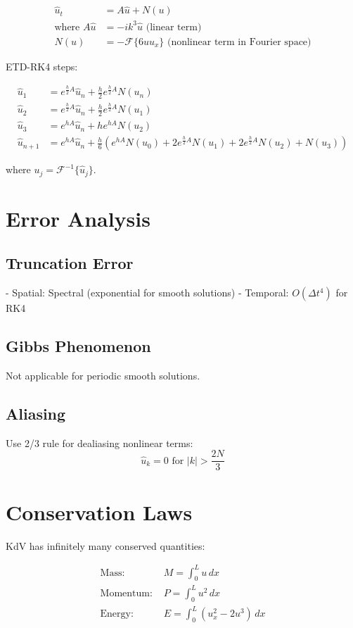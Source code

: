 \documentclass{article}
\begin{document}
\begin{align}
\hat{u}_t &= A\hat{u} + N(u) \\
\text{where } A\hat{u} &= -i k^3 \hat{u} \text{ (linear term)} \\
N(u) &= -\mathcal{F}\{6uu_x\} \text{ (nonlinear term in Fourier space)}
\end{align}

ETD-RK4 steps:

\begin{align}
\hat{u}_1 &= e^{\frac{h}{2}A}\hat{u}_n + \frac{h}{2}e^{\frac{h}{2}A}N(u_n) \\
\hat{u}_2 &= e^{\frac{h}{2}A}\hat{u}_n + \frac{h}{2}e^{\frac{h}{2}A}N(u_1) \\
\hat{u}_3 &= e^{hA}\hat{u}_n + he^{hA}N(u_2) \\
\hat{u}_{n+1} &= e^{hA}\hat{u}_n + \frac{h}{6}\left(e^{hA}N(u_0) + 2e^{\frac{h}{2}A}N(u_1) + 2e^{\frac{h}{2}A}N(u_2) + N(u_3)\right)
\end{align}

where $u_j = \mathcal{F}^{-1}\{\hat{u}_j\}$.

\section{Error Analysis}

\subsection{Truncation Error}
- Spatial: Spectral (exponential for smooth solutions)
- Temporal: $O(\Delta t^4)$ for RK4

\subsection{Gibbs Phenomenon}
Not applicable for periodic smooth solutions.

\subsection{Aliasing}
Use 2/3 rule for dealiasing nonlinear terms:
\begin{equation}
\hat{u}_k = 0 \text{ for } |k| > \frac{2N}{3}
\end{equation}

\section{Conservation Laws}

KdV has infinitely many conserved quantities:

\begin{align}
\text{Mass: } &M = \int_0^L u \, dx \\
\text{Momentum: } &P = \int_0^L u^2 \, dx \\
\text{Energy: } &E = \int_0^L \left(u_x^2 - 2u^3\right) \, dx
\end{align}
\end{document}
